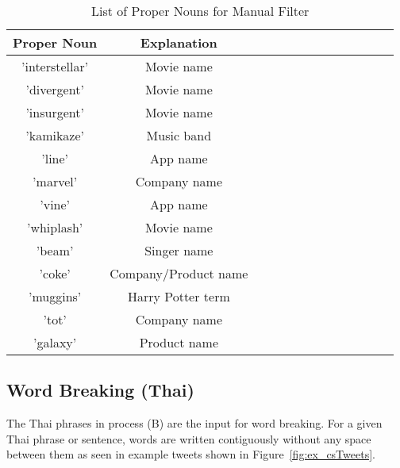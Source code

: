 \documentclass[conference]{IEEEtran}
\begin{document}
\begin{table}[h!] 
 \caption{List of Proper Nouns for Manual Filter}
\centering %
\begin{tabular}{c c c c c c rrrrrrr} %
\hline\hline %
Proper Noun		&	Explanation		
\\ [0.5ex] 
\hline 
'interstellar' 	&	Movie name	\\
'divergent'		&      Movie name       \\ 
'insurgent'		&      Movie name        \\
'kamikaze'		&      Music band        \\ 
'line'			&      App name       \\
'marvel'		&      Company name        \\
'vine'			&      App name        \\ 
'whiplash'		&      Movie name        \\
'beam'		&    	Singer name          \\
'coke'		&      Company/Product name        \\ 
'muggins'		&      Harry Potter term        \\
'tot'			&      Company name       \\
'galaxy'		&	Product name 	\\
\hline %
\end{tabular} 
\label{tab:properNouns} 
\end{table} 




\subsection{Word Breaking (Thai) }
The Thai phrases in process (B) are the input for word breaking.  For a given Thai phrase or sentence, words are written contiguously without any space between them as seen in example tweets shown in Figure~\ref{fig:ex_csTweets}. %



\end{document}
